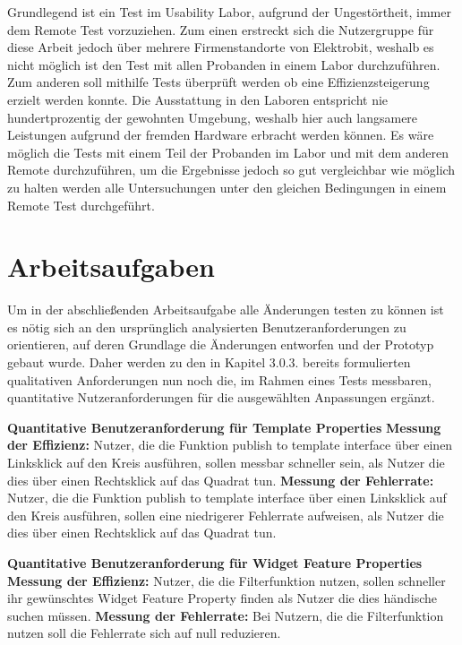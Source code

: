Grundlegend ist ein Test im Usability Labor, aufgrund der Ungestörtheit, immer dem Remote Test vorzuziehen.
Zum einen erstreckt sich die Nutzergruppe für diese Arbeit  jedoch über mehrere Firmenstandorte von Elektrobit, weshalb es nicht möglich ist den Test mit allen Probanden in einem Labor durchzuführen.
Zum anderen soll mithilfe Tests überprüft werden ob eine Effizienzsteigerung erzielt werden konnte.
Die Ausstattung in den Laboren entspricht nie hundertprozentig der gewohnten Umgebung, weshalb hier auch langsamere Leistungen aufgrund der fremden Hardware erbracht werden können.
Es wäre möglich die Tests mit einem Teil der Probanden im Labor und mit dem anderen Remote durchzuführen, um die Ergebnisse jedoch so gut vergleichbar wie möglich zu halten werden alle Untersuchungen unter den gleichen Bedingungen in einem Remote Test durchgeführt.

\section{Arbeitsaufgaben}

Um in der abschließenden Arbeitsaufgabe alle Änderungen testen zu können ist es nötig sich an den ursprünglich analysierten Benutzeranforderungen zu orientieren, auf deren Grundlage die Änderungen entworfen und der Prototyp gebaut wurde.
Daher werden zu den in Kapitel 3.0.3. bereits formulierten qualitativen Anforderungen nun noch die, im Rahmen eines Tests messbaren, quantitative Nutzeranforderungen für die ausgewählten Anpassungen ergänzt.

\textbf{Quantitative Benutzeranforderung für Template Properties}\newline
\textbf{Messung der Effizienz:}
Nutzer, die die Funktion \glqq publish to template interface\grqq{} über einen Linksklick auf den Kreis ausführen, sollen messbar schneller sein, als Nutzer die dies über einen Rechtsklick auf das Quadrat tun. \newline
\textbf{Messung der Fehlerrate:} 
Nutzer, die die Funktion \glqq publish to template interface\grqq{} über einen Linksklick auf den Kreis ausführen, sollen eine niedrigerer Fehlerrate aufweisen, als Nutzer die dies über einen Rechtsklick auf das Quadrat tun.

\textbf{Quantitative Benutzeranforderung für Widget Feature Properties} \newline
\textbf{Messung der Effizienz:}
Nutzer, die die Filterfunktion nutzen, sollen schneller ihr gewünschtes Widget Feature Property finden als Nutzer die dies händische suchen müssen. \newline
\textbf{Messung der Fehlerrate:}
Bei Nutzern, die die Filterfunktion nutzen soll die Fehlerrate sich auf null reduzieren.


